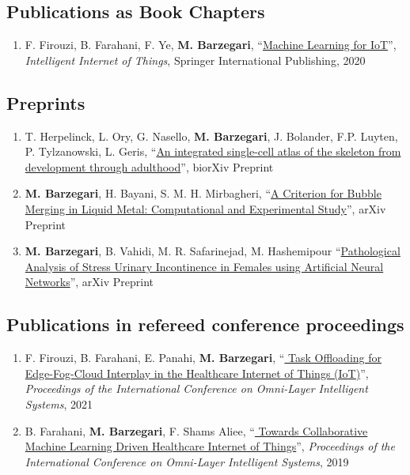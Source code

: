 \documentclass{cv}
\begin{document}
\subsection{Publications as Book Chapters}

\begin{enumerate}[itemsep=-0.2ex]
\item
F. Firouzi, B. Farahani, F. Ye, \textbf{M. Barzegari}, ``\href{https://link.springer.com/chapter/10.1007\%2F978-3-030-30367-9_5}{Machine Learning for IoT}'', \textit{Intelligent Internet of Things}, Springer International Publishing, 2020
\end{enumerate}

\subsection{Preprints}
\begin{enumerate}[itemsep=-0.2ex]
\item
T. Herpelinck,  L. Ory,  G. Nasello, \textbf{M. Barzegari}, J. Bolander,  F.P. Luyten,  P. Tylzanowski,  L. Geris, ``\href{https://www.biorxiv.org/content/10.1101/2022.03.14.484345v2}{An integrated single-cell atlas of the skeleton from development through adulthood}'', biorXiv Preprint

\item
\textbf{M. Barzegari}, H. Bayani, S. M. H. Mirbagheri, ``\href{https://arxiv.org/abs/1708.01608}{A Criterion for Bubble Merging in Liquid Metal: Computational and Experimental Study}'', arXiv Preprint
\item
\textbf{M. Barzegari}, B. Vahidi, M. R. Safarinejad, M. Hashemipour ``\href{https://arxiv.org/abs/1803.01843}{Pathological Analysis of Stress Urinary Incontinence in Females using Artificial Neural Networks}'', arXiv Preprint
\end{enumerate}

\subsection{Publications in refereed conference proceedings}
\begin{enumerate}[itemsep=-0.2ex]
\item
F. Firouzi, B. Farahani, E. Panahi, \textbf{M. Barzegari}, ``\href{https://ieeexplore.ieee.org/abstract/document/9524098}{
Task Offloading for Edge-Fog-Cloud Interplay in the Healthcare Internet of Things (IoT)}'', \textit{Proceedings of the International Conference on Omni-Layer Intelligent Systems}, 2021
\item
B. Farahani, \textbf{M. Barzegari}, F. Shams Aliee, ``\href{https://dl.acm.org/citation.cfm?id=3312644}{
Towards Collaborative Machine Learning Driven Healthcare Internet of Things}'', \textit{Proceedings of the International Conference on Omni-Layer Intelligent Systems}, 2019 
\end{enumerate}
\end{document}
